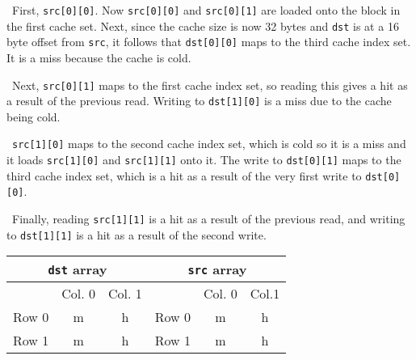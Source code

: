 \documentclass[12pt]{article}
\newenvironment{sol}[1][Solution]{\begin{trivlist}
		\item[\hskip \labelsep {\bfseries #1:}]}{\end{trivlist}}
\begin{document}
\begin{sol}
\begin{enumerate}[label=(\alph*)]
		\
		First, \texttt{src[0][0]}. Now \texttt{src[0][0]} and \texttt{src[0][1]} are
		loaded onto the block in the first cache set. Next, since the cache size is now
		32 bytes and \texttt{dst} is at a 16 byte offset from \texttt{src}, it follows that
		\texttt{dst[0][0]} maps to the third cache index set. It is a miss because the
		cache is cold.
		
		\
		Next, \texttt{src[0][1]} maps to the first cache index set, so reading this gives
		a hit as a result of the previous read. Writing to \texttt{dst[1][0]} is a miss
		due to the cache being cold.
		
		\
		\texttt{src[1][0]} maps to the second cache index set, which is cold so it is a miss
		and it loads \texttt{src[1][0]} and \texttt{src[1][1]} onto it. The write to
		\texttt{dst[0][1]} maps to the third cache index set, which is a hit as a result
		of the very first write to \texttt{dst[0][0]}.
		
		\
		Finally, reading \texttt{src[1][1]} is a hit as a result of the previous read,
		and writing to \texttt{dst[1][1]} is a hit as a result of the second write.
		\begin{center}
			\begin{tabular}{ccc|ccc}
				\multicolumn{3}{c}{\texttt{dst} array} & \multicolumn{3}{c}{\texttt{src} array}\\
				\hline
				{} & Col. 0 & Col. 1 & {} & Col. 0 & Col.1\\
				\hline
				Row 0 & m & h & Row 0 & m & h\\
				Row 1 & m & h & Row 1 & m & h
			\end{tabular}
		\end{center}
	\end{enumerate}
\end{sol}
\end{document}
